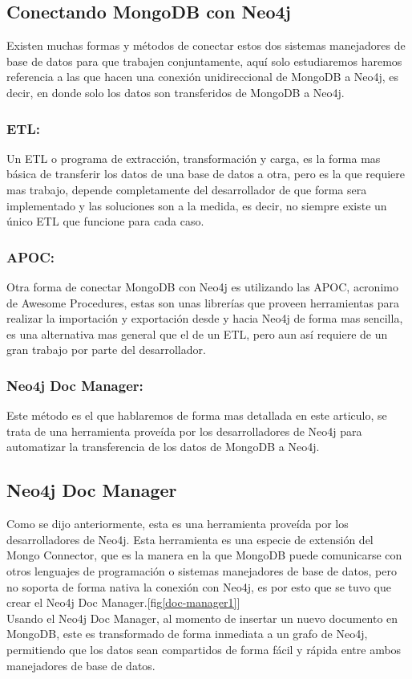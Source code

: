 \documentclass[conference,compsoc]{IEEEtran}
\begin{document}
\subsection{Conectando MongoDB con Neo4j}
Existen muchas formas y métodos de conectar estos dos sistemas manejadores de base de datos para que trabajen conjuntamente, aquí solo estudiaremos haremos referencia a las que hacen una conexión unidireccional de MongoDB a Neo4j, es decir, en donde solo los datos son transferidos de MongoDB a Neo4j.

\subsubsection{ETL:}
Un ETL o programa de extracción, transformación y carga, es la forma mas básica de transferir los datos de una base de datos a otra, pero es la que requiere mas trabajo, depende completamente del desarrollador de que forma sera implementado y las soluciones son a la medida, es decir, no siempre existe un único ETL que funcione para cada caso.

\subsubsection{APOC:}
Otra forma de conectar MongoDB con Neo4j es utilizando las APOC, acronimo de Awesome Procedures, estas son unas librerías que proveen herramientas para realizar la importación y exportación desde y hacia Neo4j de forma mas sencilla, es una alternativa mas general que el de un ETL, pero aun así requiere de un gran trabajo por parte del desarrollador.\cite{art3}

\subsubsection{Neo4j Doc Manager:}
Este método es el que hablaremos de forma mas detallada en este articulo, se trata de una herramienta proveída por los desarrolladores de Neo4j para automatizar la transferencia de los datos de MongoDB a Neo4j.\cite{art4}

\subsection{Neo4j Doc Manager}
Como se dijo anteriormente, esta es una herramienta proveída por los desarrolladores de Neo4j. Esta herramienta es una especie de extensión del Mongo Connector, que es la manera en la que MongoDB puede comunicarse con otros lenguajes de programación o sistemas manejadores de base de datos, pero no soporta de forma nativa la conexión con Neo4j, es por esto que se tuvo que crear el Neo4j Doc Manager.[fig\ref{doc-manager1}]
\\
Usando el Neo4j Doc Manager, al momento de insertar un nuevo documento en MongoDB, este es transformado de forma inmediata a un grafo de Neo4j, permitiendo que los datos sean compartidos de forma fácil y rápida entre ambos manejadores de base de datos.
\end{document}

